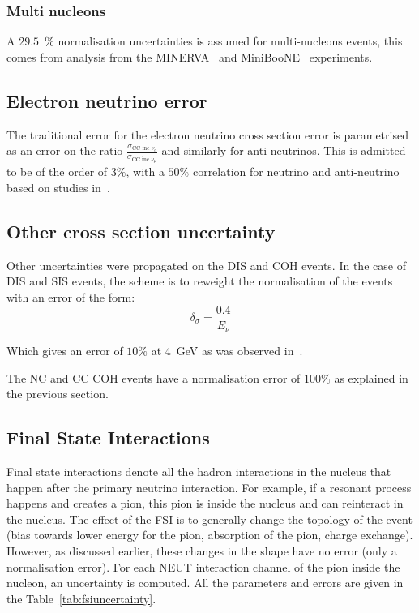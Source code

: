 \subsubsection{Multi nucleons}
A $29.5$~\% normalisation uncertainties is assumed for multi-nucleons
events, this comes from analysis from the
\Gls{MINERVA}~\cite{MinervaNuCCQE} and
\Gls{MiniBooNE}~\cite{MiniBooNENuCCQE} experiments.

\subsection{Electron neutrino error}
\label{subsec:electnuerror}
The traditional error for the electron neutrino cross section error is
parametrised as an error on the ratio
$\frac{\sigma_{\text{CC~inc~}\nu_e}}{\sigma_{\text{CC~inc~}\nu_\mu}}$
and similarly for anti-neutrinos. This is admitted to be of the order
of $3\%$, with a $50\%$ correlation for neutrino and anti-neutrino
based on studies in~\cite{Day:2012gb}.

\subsection{Other cross section uncertainty}
\label{subsec:othercrosssection}
Other uncertainties were propagated on the \Gls{DIS} and \Gls{COH}
events. In the case of \Gls{DIS} and \Gls{SIS} events, the scheme is
to reweight the normalisation of the events with an error of the form:
\begin{equation}
  \label{eq:diserror}
  \delta_{\sigma}=\frac{0.4}{E_\nu}
\end{equation}

Which gives an error of $10\%$ at $4$~GeV as was observed
in~\cite{Adamson:2009ju}.

The \Gls{NC} and \Gls{CC} \Gls{COH} events have a normalisation error
of $100\%$ as explained in the previous section.

\subsection{Final State Interactions}
\label{subsec:fsiuncertainty}
Final state interactions denote all the hadron interactions in the
nucleus that happen after the primary neutrino interaction. For
example, if a resonant process happens and creates a pion, this pion
is inside the nucleus and can reinteract in the nucleus. The effect of
the \Gls{FSI} is to generally change the topology of the event (bias
towards lower energy for the pion, absorption of the pion, charge
exchange). However, as discussed earlier, these changes in the shape
have no error (only a normalisation error). For each \Gls{NEUT}
interaction channel of the pion inside the nucleon, an uncertainty is
computed. All the parameters and errors are given in the
Table~\ref{tab:fsiuncertainty}.

